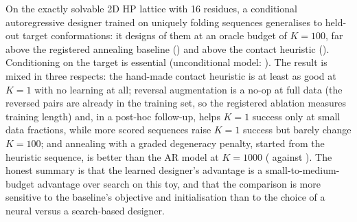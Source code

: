 On the exactly solvable 2D HP lattice with 16 residues, a conditional autoregressive designer trained on uniquely folding sequences generalises to held-out target conformations: it designs  of them at an oracle budget of $K=100$, far above the registered annealing baseline () and above the contact heuristic (). Conditioning on the target is essential (unconditional model: ). The result is mixed in three respects: the hand-made contact heuristic is at least as good at $K=1$ with no learning at all; reversal augmentation is a no-op at full data (the reversed pairs are already in the training set, so the registered ablation measures training length) and, in a post-hoc follow-up, helps $K=1$ success only at small data fractions, while more scored sequences raise $K=1$ success but barely change $K=100$; and annealing with a graded degeneracy penalty, started from the heuristic sequence, is better than the AR model at $K=1000$ ( against ). The honest summary is that the learned designer's advantage is a small-to-medium-budget advantage over search on this toy, and that the comparison is more sensitive to the baseline's objective and initialisation than to the choice of a neural versus a search-based designer.

